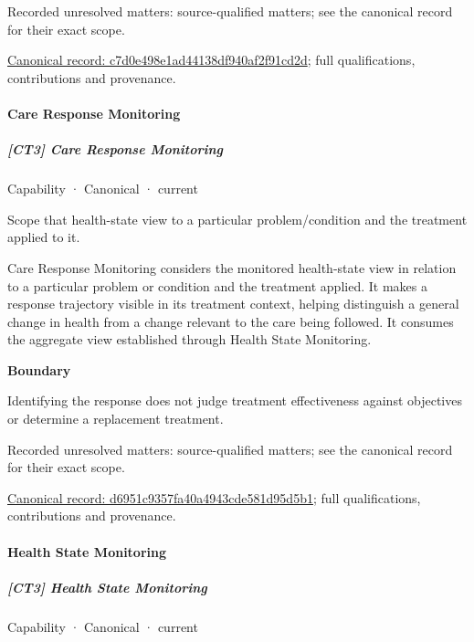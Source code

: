 {\small Recorded unresolved matters: source-qualified matters; see the canonical record for their exact scope.}\par
{\footnotesize \href{../../../../continuum/strategy/capability/c7d0e498e1ad44138df940af2f91cd2d.md}{Canonical record: c7d0e498e1ad44138df940af2f91cd2d}; full qualifications, contributions and provenance.}\par
\paragraph{Care Response Monitoring}

\subparagraph{[CT3] Care Response Monitoring}

\label{element:d6951c9357fa40a4943cde581d95d5b1}
{\small Capability · Canonical · current}\par

Scope that health-state view to a particular problem/condition and the treatment applied to it.



Care Response Monitoring considers the monitored health-state view in relation to a particular problem or condition and the treatment applied. It makes a response trajectory visible in its treatment context, helping distinguish a general change in health from a change relevant to the care being followed. It consumes the aggregate view established through Health State Monitoring.



\textbf{Boundary}



Identifying the response does not judge treatment effectiveness against objectives or determine a replacement treatment.


{\small Recorded unresolved matters: source-qualified matters; see the canonical record for their exact scope.}\par
{\footnotesize \href{../../../../continuum/strategy/capability/d6951c9357fa40a4943cde581d95d5b1.md}{Canonical record: d6951c9357fa40a4943cde581d95d5b1}; full qualifications, contributions and provenance.}\par
\paragraph{Health State Monitoring}

\subparagraph{[CT3] Health State Monitoring}

\label{element:d77f22909f8b47dba4cbd95982e576df}
{\small Capability · Canonical · current}\par

